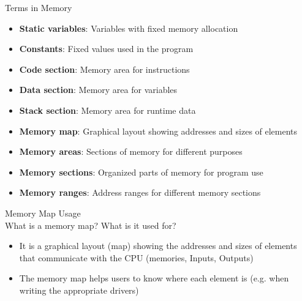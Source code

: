 \begin{example2}{Terms in Memory}
\begin{itemize}
  \item \textbf{Static variables}: Variables with fixed memory allocation
  \item \textbf{Constants}: Fixed values used in the program
  \item \textbf{Code section}: Memory area for instructions
  \item \textbf{Data section}: Memory area for variables
  \item \textbf{Stack section}: Memory area for runtime data
  \item \textbf{Memory map}: Graphical layout showing addresses and sizes of elements
  \item \textbf{Memory areas}: Sections of memory for different purposes
  \item \textbf{Memory sections}: Organized parts of memory for program use
  \item \textbf{Memory ranges}: Address ranges for different memory sections
\end{itemize}
\end{example2}

\columnbreak

\begin{example2}{Memory Map Usage}\\
What is a memory map? What is it used for?
\begin{itemize}
  \item It is a graphical layout (map) showing the addresses and sizes of elements that communicate with the CPU (memories, Inputs, Outputs)
  \item The memory map helps users to know where each element is (e.g. when writing the appropriate drivers)
\end{itemize}
\end{example2}


